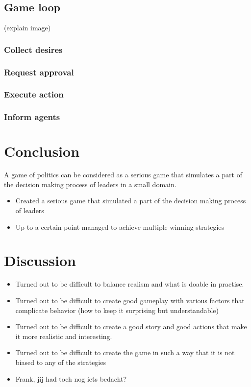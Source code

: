 \documentclass[11pt,a4paper]{article}
\begin{document}
  \subsection{Game loop} 
  (explain image)
    \subsubsection{Collect desires}
    \subsubsection{Request approval}
    \subsubsection{Execute action}
    \subsubsection{Inform agents}


\section{Conclusion}
A game of politics can be considered as a serious game that simulates a part of the decision making process of leaders in a small domain. 

 
  \begin{itemize}
    \item Created a serious game that simulated a part of the decision making process of leaders
    \item Up to a certain point managed to achieve multiple winning strategies
  \end{itemize}
  
\section{Discussion}
  \begin{itemize}
    \item Turned out to be difficult to balance realism and what is doable in practise.
    \item Turned out to be difficult to create good gameplay with various factors that complicate behavior (how to keep it surprising but understandable)
    \item Turned out to be difficult to create a good story and good actions that make it more realistic and interesting.
    \item Turned out to be difficult to create the game in such a way that it is not biased to any of the strategies
    \item Frank, jij had toch nog iets bedacht?
  \end{itemize}
\end{document}

